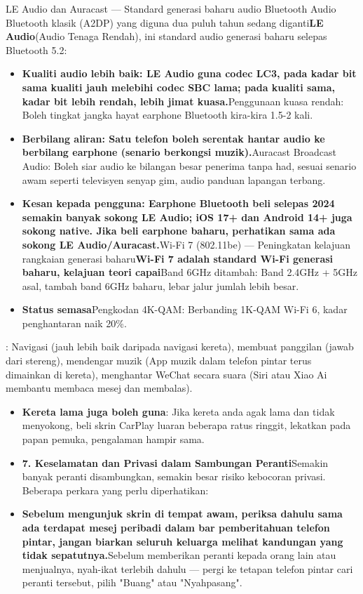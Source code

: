 \begin{tcbinfo}{LE Audio dan Auracast — Standard generasi baharu audio Bluetooth}
Audio Bluetooth klasik (A2DP) yang diguna dua puluh tahun sedang diganti\textbf{LE Audio}(Audio Tenaga Rendah), ini standard audio generasi baharu selepas Bluetooth 5.2:

\begin{itemize}
  \item \textbf{Kualiti audio lebih baik: LE Audio guna codec LC3, pada kadar bit sama kualiti jauh melebihi codec SBC lama; pada kualiti sama, kadar bit lebih rendah, lebih jimat kuasa.}Penggunaan kuasa rendah: Boleh tingkat jangka hayat earphone Bluetooth kira-kira 1.5-2 kali.
  \item \textbf{Berbilang aliran: Satu telefon boleh serentak hantar audio ke berbilang earphone (senario berkongsi muzik).}Auracast Broadcast Audio: Boleh siar audio ke bilangan besar penerima tanpa had, sesuai senario awam seperti televisyen senyap gim, audio panduan lapangan terbang.
  \item \textbf{Kesan kepada pengguna: Earphone Bluetooth beli selepas 2024 semakin banyak sokong LE Audio; iOS 17+ dan Android 14+ juga sokong native. Jika beli earphone baharu, perhatikan sama ada sokong LE Audio/Auracast.}Wi-Fi 7 (802.11be) — Peningkatan kelajuan rangkaian generasi baharu\textbf{Wi-Fi 7 adalah standard Wi-Fi generasi baharu, kelajuan teori capai}Band 6GHz ditambah: Band 2.4GHz + 5GHz asal, tambah band 6GHz baharu, lebar jalur jumlah lebih besar.
  \item \textbf{Status semasa}Pengkodan 4K-QAM: Berbanding 1K-QAM Wi-Fi 6, kadar penghantaran naik 20\%.
\end{itemize}

\end{tcbinfo}


: Navigasi (jauh lebih baik daripada navigasi kereta), membuat panggilan (jawab dari stereng), mendengar muzik (App muzik dalam telefon pintar terus dimainkan di kereta), menghantar WeChat secara suara (Siri atau Xiao Ai membantu membaca mesej dan membalas).

\begin{itemize}
  \item \textbf{Kereta lama juga boleh guna}: Jika kereta anda agak lama dan tidak menyokong, beli skrin CarPlay luaran beberapa ratus ringgit, lekatkan pada papan pemuka, pengalaman hampir sama.
  \item \textbf{7. Keselamatan dan Privasi dalam Sambungan Peranti}Semakin banyak peranti disambungkan, semakin besar risiko kebocoran privasi. Beberapa perkara yang perlu diperhatikan:
  \item \textbf{Sebelum mengunjuk skrin di tempat awam, periksa dahulu sama ada terdapat mesej peribadi dalam bar pemberitahuan telefon pintar, jangan biarkan seluruh keluarga melihat kandungan yang tidak sepatutnya.}Sebelum memberikan peranti kepada orang lain atau menjualnya, nyah-ikat terlebih dahulu — pergi ke tetapan telefon pintar cari peranti tersebut, pilih "Buang" atau "Nyahpasang".
\end{itemize}


